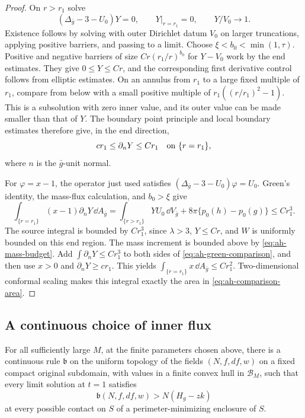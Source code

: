 \begin{proof}
On \(r>r_1\) solve
\[
 (\Delta_{\bar g}-3-U_0)Y=0,\qquad
 Y|_{r=r_1}=0,\qquad Y/V_0\longrightarrow1 .
\]
Existence follows by solving with outer Dirichlet datum
\(V_0\) on larger truncations, applying positive barriers,
and passing to a limit.  Choose
\(\xi<b_0<\min(1,\tau)\).
Positive and negative barriers of size
\(Cr(r_1/r)^{b_0}\) for \(Y-V_0\) work by the end estimates.
They give \(0\le Y\le Cr\), and the corresponding first
derivative control follows from elliptic estimates.
On an annulus from \(r_1\) to a large fixed multiple of
\(r_1\), compare from below with a small positive multiple
of \(r_1((r/r_1)^2-1)\).  This is a subsolution with zero
inner value, and its outer value can be made smaller than
that of \(Y\).  The boundary point principle and local
boundary estimates therefore give, in the end direction,
\[
 cr_1\le\partial_nY\le Cr_1
      \quad\hbox{on }\{r=r_1\},
\]
where \(n\) is the \(\bar g\)-unit normal.

For \(\varphi=x-1\), the operator just used satisfies
\((\Delta_{\bar g}-3-U_0)\varphi=U_0\).
Green's identity, the mass-flux calculation, and
\(b_0>\xi\) give
\begin{equation}\label{eq:ah-green-comparison}
 \int_{\{r=r_1\}}(x-1)\partial_nY\,\dd A_{\bar g}
 =\int_{\{r>r_1\}}YU_0\,\dd V_{\bar g}
       +8\pi\{p_0(h)-p_0(g)\}
 \le Cr_1^3 .
\end{equation}
The source integral is bounded by \(Cr_1^3\), since
\(\lambda>3\), \(Y\le Cr\), and \(W\) is uniformly bounded
on this end region.  The mass increment is bounded above
by \eqref{eq:ah-mass-budget}.  Add
\(\int\partial_nY\le Cr_1^3\) to both sides of
\eqref{eq:ah-green-comparison}, and then use \(x>0\) and
\(\partial_nY\ge cr_1\).  This yields
\(\int_{\{r=r_1\}}x\,\dd A_{\bar g}\le Cr_1^2\).
Two-dimensional conformal scaling makes this integral
exactly the area in \eqref{eq:ah-comparison-area}.
\end{proof}

\subsection{A continuous choice of inner flux}

\begin{lemma}\label{lem:ah-contact-selector}
For all sufficiently large \(M\), at the finite parameters
chosen above, there is a continuous rule \(\mathfrak b\) on
the uniform topology of the fields \((N,f,df,w)\) on a fixed
compact original subdomain, with values in a finite convex
hull in \(\mathcal B_M\), such that every limit solution at
\(t=1\) satisfies
\begin{equation}\label{eq:ah-contact-majorant}
 \mathfrak b(N,f,df,w)>N(H_g-zk)
\end{equation}
at every possible contact on \(S\) of a perimeter-minimizing
enclosure of \(S\).
\end{lemma}

